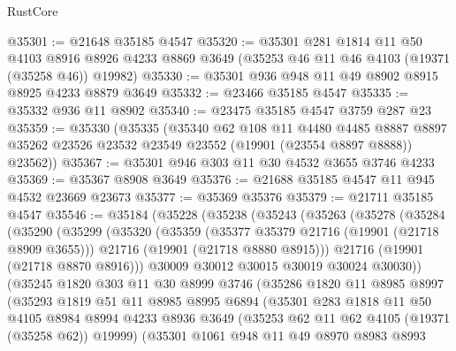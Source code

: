 \begin{lexlean}{RustCore}
\begin{coremodule}
@35301 := @21648 @35185 @4547
@35320 := @35301
    @281
    @1814
    @11
    @50
    @4103
    @8916
    @8926
    @4233
    @8869
    @3649
    (@35253 @46 @11 @46 @4103 (@19371 (@35258 @46)) @19982)
@35330 := @35301 @936 @948 @11 @49 @8902 @8915 @8925 @4233 @8879 @3649
@35332 := @23466 @35185 @4547
@35335 := @35332 @936 @11 @8902
@35340 := @23475 @35185 @4547 @3759 @287 @23
@35359 := @35330
    (@35335
      (@35340
        @62
        @108
        @11
        @4480
        @4485
        @8887
        @8897
        @35262
        @23526
        @23532
        @23549
        @23552
        (@19901 (@23554 @8897 @8888))
        @23562))
@35367 := @35301 @946 @303 @11 @30 @4532 @3655 @3746 @4233
@35369 := @35367 @8908 @3649
@35376 := @21688 @35185 @4547 @11 @945 @4532 @23669 @23673
@35377 := @35369 @35376
@35379 := @21711 @35185 @4547
@35546 := @35184
    (@35228
      (@35238
        (@35243
          (@35263
            (@35278
              (@35284
                (@35290
                  (@35299
                    (@35320
                      (@35359
                        (@35377 @35379 @21716 (@19901 (@21718 @8909 @3655)))
                        @21716
                        (@19901 (@21718 @8880 @8915)))
                      @21716
                      (@19901 (@21718 @8870 @8916)))
                    @30009
                    @30012
                    @30015
                    @30019
                    @30024
                    @30030))
                (@35245
                  @1820
                  @303
                  @11
                  @30
                  @8999
                  @3746
                  (@35286
                    @1820
                    @11
                    @8985
                    @8997
                    (@35293
                      @1819
                      @51
                      @11
                      @8985
                      @8995
                      @6894
                      (@35301
                        @283
                        @1818
                        @11
                        @50
                        @4105
                        @8984
                        @8994
                        @4233
                        @8936
                        @3649
                        (@35253 @62 @11 @62 @4105 (@19371 (@35258 @62)) @19999)
                        (@35301
                          @1061
                          @948
                          @11
                          @49
                          @8970
                          @8983
                          @8993

\end{coremodule}
\end{lexlean}
